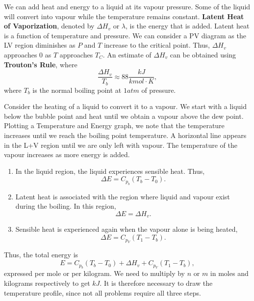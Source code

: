 \documentclass[11pt]{article}
\theoremstyle{plain} %
\theoremstyle{definition}
\theoremstyle{example}
\theoremstyle{remark}
\begin{document}
We can add heat and energy to a liquid at its vapour pressure. Some of the liquid will convert into vapour while the temperature remains constant. 
\textbf{Latent Heat of Vaporization}, denoted by $\Delta H_v$ or $\lambda$, is the energy that is added. Latent heat is a function of temperature and pressure. We can consider a PV diagram as the LV region diminishes as $P$ and $T$ increase to the critical point. Thus, $\Delta H_v$ approaches 0 as $T$ approaches $T_C$. An estimate of $\Delta H_v$ can be obtained using \textbf{Trouton's Rule}, where 
$$\frac{\Delta H_v}{T_b} \approx 88\frac{kJ}{kmol\cdot K},$$
where $T_b$ is the normal boiling point at $1 atm$ of pressure. 

Consider the heating of a liquid to convert it to a vapour. We start with a liquid below the bubble point and heat until we obtain a vapour above the dew point. Plotting a Temperature and Energy graph, we note that the temperature increases until we reach the boiling point temperature. A horizontal line appears in the L+V region until we are only left with vapour. The temperature of the vapour increases as more energy is added. 
	\begin{enumerate}
		\item In the liquid region, the liquid experiences sensible heat. Thus, 
		$$\Delta E = C_{p_b} (T_b-T_0).$$
		\item  Latent heat is associated with the region where liquid and vapour exist during the boiling. In this region,
		$$\Delta E = \Delta H_v.$$
		\item Sensible heat is experienced again when the vapour alone is being heated,
		$$\Delta E = C_{p_V}(T_1-T_b).$$
	\end{enumerate}
Thus, the total energy is 
$$E = C_{p_b} (T_b-T_0)+\Delta H_v + C_{p_V}(T_1-T_b),$$
expressed per mole or per kilogram. We need to multiply by $n$ or $m$ in moles and kilograms respectively to get $kJ$. It is therefore necessary to draw the temperature profile, since not all problems require all three steps. 
\end{document}
